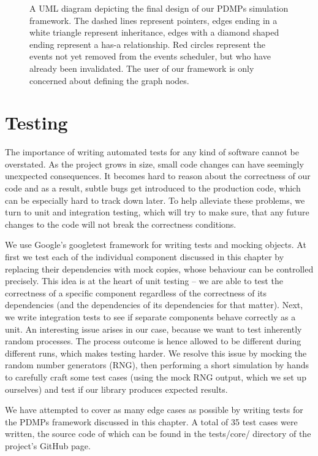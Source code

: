 \documentclass[report.tex]{subfiles}
\begin{document}
\begin{figure}
  \centering
  \def\svgwidth{.95\linewidth}
  
  \caption{A UML diagram depicting the final design of our PDMPs simulation framework.
           The dashed lines represent pointers, edges ending in a white triangle
           represent inheritance, edges with a diamond shaped ending represent a
           has-a relationship. Red circles represent the events not yet removed
           from the events scheduler, but who have already been invalidated.
           The user of our framework is only concerned about defining the graph nodes.}
  \label{image-uml-diagram-dependencies-graph-based-design}
\end{figure}

\section{Testing}

The importance of writing automated tests for any kind of software cannot be overstated.
As the project grows in size, small code changes can have seemingly unexpected consequences.
It becomes hard to reason about the correctness of our code and as a result,
subtle bugs get introduced to the production code, which can be especially hard to
track down later. To help alleviate these problems, we turn to unit and integration testing,
which will try to make sure, that any future changes to the code will not break the
correctness conditions.

We use Google's googletest \cite{googletest-library}
framework for writing tests and mocking objects.
At first we test each of the individual component discussed in this chapter by
replacing their dependencies with mock copies, whose behaviour can be controlled precisely.
This idea is at the heart of unit testing -- we are able to test the correctness of a
specific component regardless of the correctness of its dependencies
(and the dependencies of its dependencies for that matter).
Next, we write integration tests to see if separate components behave correctly as a unit.
An interesting issue arises in our case, because we want to test inherently random
processes. The process outcome is hence allowed to be different during different
runs, which makes testing harder.
We resolve this issue by mocking the random number generators (RNG), then performing
a short simulation by hands to carefully craft some test cases
(using the mock RNG output, which we set up ourselves)
and test if our library produces expected results.

We have attempted to cover as many edge cases as possible by writing tests
for the PDMPs framework discussed in this chapter. A total of 35 test cases were
written, the source code of which can be found in the tests/core/ directory of the
project's GitHub page.
\end{document}
